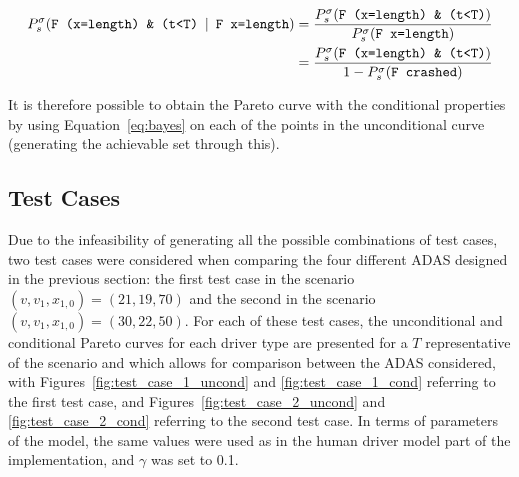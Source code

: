 \begin{equation}
\label{eq:bayes}
\begin{aligned}
	P^{\sigma}_s (\text{\texttt{F (x=length) \& (t<T)}} \:\mid\: \text{\texttt{F x=length}}) & = \frac{P^{\sigma}_s (\text{\texttt{F (x=length) \& (t<T)}})}{P^{\sigma}_s (\text{\texttt{F x=length}})} \\
	&  = \frac{P^{\sigma}_s (\text{\texttt{F (x=length) \& (t<T)}})}{1 - P^{\sigma}_s (\text{\texttt{F crashed}})}
\end{aligned}
\end{equation}

It is therefore possible to obtain the Pareto curve with the conditional properties by using Equation~\ref{eq:bayes} on each of the points in the unconditional curve (generating the achievable set through this).

\subsection{Test Cases}

Due to the infeasibility of generating all the possible combinations of test cases, two test cases were considered when comparing the four different ADAS designed in the previous section: the first test case in the scenario $(v, v_1, x_{1,0}) = (21, 19, 70)$ and the second in the scenario $(v, v_1, x_{1,0}) = (30, 22, 50)$. For each of these test cases, the unconditional and conditional Pareto curves for each driver type are presented for a $T$ representative of the scenario and which allows for comparison between the ADAS considered, with Figures~\ref{fig:test_case_1_uncond} and \ref{fig:test_case_1_cond} referring to the first test case, and Figures~\ref{fig:test_case_2_uncond} and \ref{fig:test_case_2_cond} referring to the second test case. In terms of parameters of the model, the same values were used as in the human driver model part of the implementation, and $\gamma$ was set to 0.1.

%

